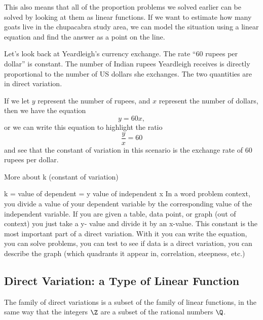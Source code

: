 This also means that all of the proportion problems we solved earlier can be solved by looking at them as linear functions. If we want to estimate how many goats live in the chupacabra study area, we can model the situation using a linear equation and find the answer as a point on the line.

Let's look back at Yeardleigh's currency exchange. The rate ``60 rupees per dollar'' is constant. The number of Indian rupees Yeardleigh receives is directly proportional to the number of US dollars she exchanges. The two quantities are in direct variation.

If we let $y$ represent the number of rupees, and $x$ represent the number of dollars, then we have the equation \[y = 60x,\] or we can write this equation to highlight the ratio \[\frac{y}{x} = 60\] and see that the constant of variation in this scenario is the exchange rate of 60 rupees per dollar.

More about k (constant of variation)

k = value of dependent = y value of independent x
In a word problem context, you divide a value of your dependent variable by the corresponding value of the independent variable. If you are given a table, data point, or graph (out of context) you just take a y- value and divide it by an x-value.
This constant is the most important part of a direct variation. With it you can write the equation, you can solve problems, you can test to see if data is a direct variation, you can describe the graph (which quadrants it appear in, correlation, steepness, etc.)

\subsection{Direct Variation: a Type of Linear Function}

The family of direct variations is a subset of the family of linear functions, in the same way that the integers $\Z$ are a subset of the rational numbers $\Q$.

\begin{center}
\end{center}

